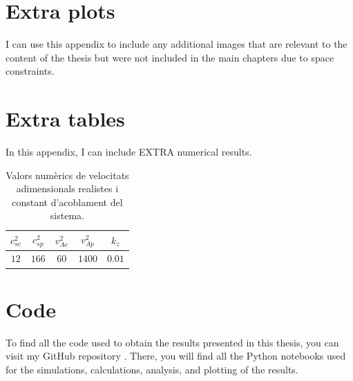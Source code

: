 \newpage
\renewcommand{\theequation}{\Alph{section}\arabic{equation}}
\setcounter{equation}{0}

\chapter{Extra plots}\label{ap.A}

I can use this appendix to include any additional images that are relevant to the content of the thesis but were not included in the main chapters due to space constraints.



\chapter{Extra tables} \label{ap.B}
In this appendix, I can include EXTRA numerical results.

\begin{table}[H]
	\centering
	\begin{tabular}{|c|c|c|c|c|}
		\hline
		$c_{s c}^2$ & $c_{s p}^2$ & $v_{A c}^2$ & $v_{A p}^2$ & $k_z$ \\
		\hline
		$12$ & $166$ & $60$ & $1400$ & $0.01$ \\
		\hline
	\end{tabular}
	\caption{Valors numèrics de velocitats adimensionals realistes i constant d'acoblament del sistema.}
	\label{tab:valors_apendix}
\end{table}


\chapter{Code}\label{ap.C}

To find all the code used to obtain the results presented in this thesis, you can visit my GitHub repository \parencite{github}.
There, you will find all the Python notebooks used for the simulations, calculations, analysis, and plotting of the results.
